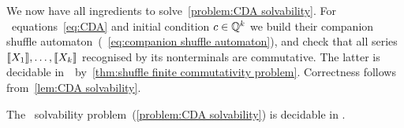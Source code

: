 \begin{example}
\end{example}

We now have all ingredients to solve~\cref{problem:CDA solvability}.
%
For \CDA~equations~\cref{eq:CDA} and initial condition $c \in \mathbb Q^k$
we build their companion shuffle automaton~(\cf~\cref{eq:companion shuffle automaton}),
and check that all series $\llbracket X_1\rrbracket, \dots, \llbracket X_k\rrbracket$ recognised by its nonterminals are commutative.
The latter is decidable in~\TWOEXPSPACE~by~\cref{thm:shuffle finite commutativity problem}.
%
Correctness follows from~\cref{lem:CDA solvability}.
%
\begin{theorem}
    \label{thm:decidability of CDA solvability}
    The \CDA~solvability problem~(\cref{problem:CDA solvability}) is decidable in \TWOEXPSPACE.
\end{theorem}

